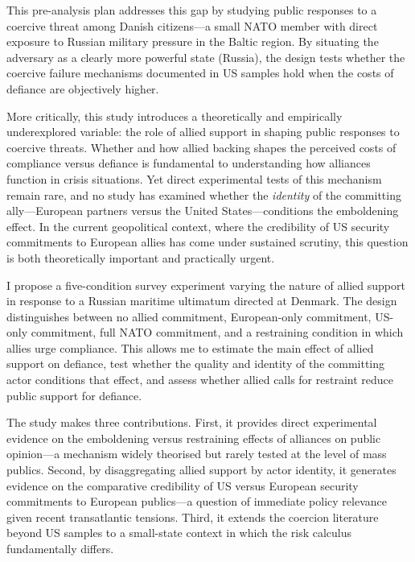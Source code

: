 This pre-analysis plan addresses this gap by studying public responses to a coercive threat among Danish citizens---a small NATO member with direct exposure to Russian military pressure in the Baltic region. By situating the adversary as a clearly more powerful state (Russia), the design tests whether the coercive failure mechanisms documented in US samples hold when the costs of defiance are objectively higher.

More critically, this study introduces a theoretically and empirically underexplored variable: the role of allied support in shaping public responses to coercive threats. Whether and how allied backing shapes the perceived costs of compliance versus defiance is fundamental to understanding how alliances function in crisis situations. Yet direct experimental tests of this mechanism remain rare, and no study has examined whether the \textit{identity} of the committing ally---European partners versus the United States---conditions the emboldening effect. In the current geopolitical context, where the credibility of US security commitments to European allies has come under sustained scrutiny, this question is both theoretically important and practically urgent.

I propose a five-condition survey experiment varying the nature of allied support in response to a Russian maritime ultimatum directed at Denmark. The design distinguishes between no allied commitment, European-only commitment, US-only commitment, full NATO commitment, and a restraining condition in which allies urge compliance. This allows me to estimate the main effect of allied support on defiance, test whether the quality and identity of the committing actor conditions that effect, and assess whether allied calls for restraint reduce public support for defiance.

The study makes three contributions. First, it provides direct experimental evidence on the emboldening versus restraining effects of alliances on public opinion---a mechanism widely theorised but rarely tested at the level of mass publics. Second, by disaggregating allied support by actor identity, it generates evidence on the comparative credibility of US versus European security commitments to European publics---a question of immediate policy relevance given recent transatlantic tensions. Third, it extends the coercion literature beyond US samples to a small-state context in which the risk calculus fundamentally differs.


